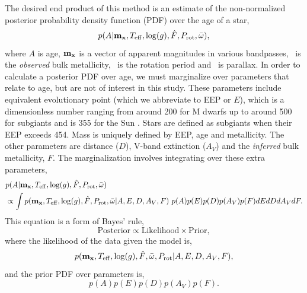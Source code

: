 The desired end product of this method is an estimate of the non-normalized
posterior probability density function (PDF) over the age of a star,
\begin{equation} \label{eqn:eqn1}
    p(A|{\bf m_x}, T_{\mathrm{eff}}, \log(g), \hat{F},
    P_{\mathrm{rot}}, \bar{\omega}),
\end{equation}
where $A$ is age, ${\bf m_x}$ is a vector of
apparent magnitudes in various bandpasses, \fhat\ is the {\it observed} bulk
metallicity, \prot\ is the rotation period and \pmega\ is parallax.
In order to calculate a posterior PDF over age, we must marginalize over
parameters that relate to age, but are not of interest in this study.
These parameters include equivalent evolutionary point (which we abbreviate to
EEP or $E$), which is a dimensionless number ranging from around 200 for M
dwarfs up to around 500 for subgiants and is 355 for the Sun
\citep[see][]{dotter2016, choi2016}.
Stars are defined as subgiants when their EEP exceeds 454.
Mass is uniquely defined by EEP, age and metallicity.
The other parameters are distance ($D$), V-band extinction ($A_V$) and the
{\it inferred} bulk metallicity, $F$.
The marginalization involves integrating over these extra parameters,
\begin{eqnarray} \label{eqn:bayes}
    & p(A|{\bf m_x}, T_{\mathrm{eff}}, \log(g), \hat{F},
    P_{\mathrm{rot}}, \bar{\omega})
\\ \nonumber
    & \propto \int p({\bf m_x}, T_{\mathrm{eff}}, \log(g), \hat{F},
    P_\mathrm{rot}, \bar{\omega}|
    A, E, D, A_V, F)~p(A)p(E)p(D)p(A_V)p(F)dEdDdA_VdF.
\end{eqnarray}
This equation is a form of Bayes' rule,
\begin{equation} \label{eqn:eqn2}
\mathrm{Posterior} \propto \mathrm{Likelihood} \times \mathrm{Prior},
\end{equation}
where the likelihood of the data given the model is,
\begin{equation} \label{eqn:full_likelihood}
    p({\bf m_x}, T_{\mathrm{eff}}, \log(g), \hat{F}, \bar{\omega},
    P_{\mathrm{rot}}|A, E, D, A_V, F),
\end{equation}
and the prior PDF over parameters is,
\begin{equation} \label{eqn:prior}
    p(A)p(E)p(D)p(A_V)p(F).
\end{equation}

